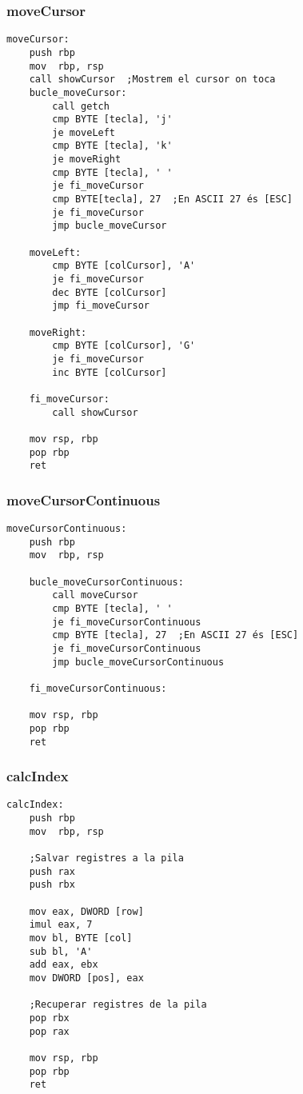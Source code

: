\documentclass[a4paper,12pt]{article}
\begin{document}
\subsubsection{moveCursor}
\begin{lstlisting}[firstnumber=406]
moveCursor:  
	push rbp
	mov  rbp, rsp
	call showCursor  ;Mostrem el cursor on toca
	bucle_moveCursor:
		call getch
		cmp BYTE [tecla], 'j'
		je moveLeft
		cmp BYTE [tecla], 'k'
		je moveRight
		cmp BYTE [tecla], ' '
		je fi_moveCursor
		cmp BYTE[tecla], 27  ;En ASCII 27 és [ESC]
		je fi_moveCursor
		jmp bucle_moveCursor

	moveLeft:
		cmp BYTE [colCursor], 'A'
		je fi_moveCursor
		dec BYTE [colCursor]
		jmp fi_moveCursor

	moveRight:
		cmp BYTE [colCursor], 'G'
		je fi_moveCursor
		inc BYTE [colCursor]

	fi_moveCursor:
		call showCursor

	mov rsp, rbp
	pop rbp
	ret
\end{lstlisting}
\subsubsection{moveCursorContinuous}
\begin{lstlisting}[firstnumber=454]
moveCursorContinuous:
	push rbp
	mov  rbp, rsp

	bucle_moveCursorContinuous:
		call moveCursor
		cmp BYTE [tecla], ' '
		je fi_moveCursorContinuous
		cmp BYTE [tecla], 27  ;En ASCII 27 és [ESC]
		je fi_moveCursorContinuous
		jmp bucle_moveCursorContinuous

	fi_moveCursorContinuous:

	mov rsp, rbp
	pop rbp
	ret
\end{lstlisting}
\subsubsection{calcIndex}
\begin{lstlisting}[firstnumber=485]
calcIndex:
	push rbp
	mov  rbp, rsp

	;Salvar registres a la pila
	push rax
	push rbx
	
	mov eax, DWORD [row]
	imul eax, 7
	mov bl, BYTE [col]
	sub bl, 'A'
	add eax, ebx
	mov DWORD [pos], eax

	;Recuperar registres de la pila
	pop rbx
	pop rax
	 
	mov rsp, rbp
	pop rbp
	ret
\end{lstlisting}
\end{document}
